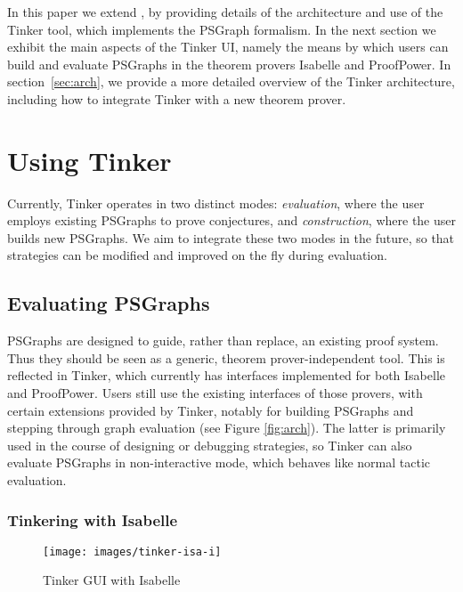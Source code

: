 \documentclass[submission,copyright,creativecommons]{eptcs}
\begin{document}
In this paper we extend \cite{LPAR13}, by providing details of the architecture and use of the Tinker tool, which implements the PSGraph formalism. In the next section we exhibit the main aspects of the Tinker UI, namely the means by which users can build and evaluate PSGraphs in the theorem provers Isabelle and ProofPower. In section~\ref{sec:arch}, we provide a more detailed overview of the Tinker architecture, including how to integrate Tinker with a new theorem prover.

\section{Using Tinker}\label{sec:ui}

Currently, Tinker operates in two distinct modes: \textit{evaluation}, where the user employs existing PSGraphs to prove conjectures, and \textit{construction}, where the user builds new PSGraphs. We aim to integrate these two modes in the future, so that strategies can be modified and improved on the fly during evaluation.

\subsection{Evaluating PSGraphs}

PSGraphs are designed to guide, rather than replace, an existing proof system. Thus they should be seen as a generic, theorem prover-independent tool. This is reflected in Tinker, which currently has interfaces implemented for both Isabelle and ProofPower. Users still use the existing interfaces of those provers, with certain extensions provided by Tinker, notably for building PSGraphs and stepping through graph evaluation (see Figure  \ref{fig:arch}). The latter is primarily used in the course of designing or debugging strategies, so Tinker can also evaluate PSGraphs in non-interactive mode, which behaves like normal tactic evaluation.

\subsubsection{Tinkering with Isabelle}

\begin{figure}
\begin{center}
\texttt{[image: images/tinker-isa-i]}
\end{center}
\vspace{-15pt}
\caption{Tinker GUI with Isabelle}\label{fig:eval:isabelle}
\end{figure}
\end{document}
